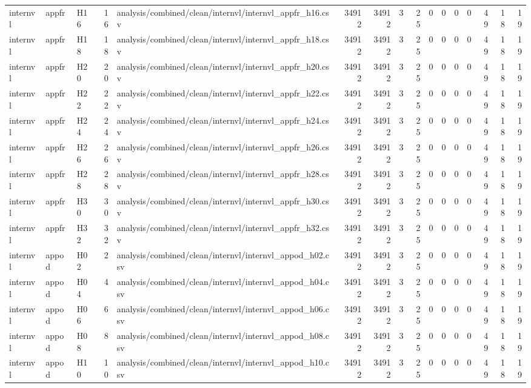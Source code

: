 \begin{longtable}{lllrlrrrrrrrrrrr}
internvl & appfr & H16 & 16 & analysis/combined/clean/internvl/internvl\_appfr\_h16.csv & 34912 & 34912 & 3 & 25 & 0 & 0 & 0 & 0 & 49 & 18 & 19 \\
internvl & appfr & H18 & 18 & analysis/combined/clean/internvl/internvl\_appfr\_h18.csv & 34912 & 34912 & 3 & 25 & 0 & 0 & 0 & 0 & 49 & 18 & 19 \\
internvl & appfr & H20 & 20 & analysis/combined/clean/internvl/internvl\_appfr\_h20.csv & 34912 & 34912 & 3 & 25 & 0 & 0 & 0 & 0 & 49 & 18 & 19 \\
internvl & appfr & H22 & 22 & analysis/combined/clean/internvl/internvl\_appfr\_h22.csv & 34912 & 34912 & 3 & 25 & 0 & 0 & 0 & 0 & 49 & 18 & 19 \\
internvl & appfr & H24 & 24 & analysis/combined/clean/internvl/internvl\_appfr\_h24.csv & 34912 & 34912 & 3 & 25 & 0 & 0 & 0 & 0 & 49 & 18 & 19 \\
internvl & appfr & H26 & 26 & analysis/combined/clean/internvl/internvl\_appfr\_h26.csv & 34912 & 34912 & 3 & 25 & 0 & 0 & 0 & 0 & 49 & 18 & 19 \\
internvl & appfr & H28 & 28 & analysis/combined/clean/internvl/internvl\_appfr\_h28.csv & 34912 & 34912 & 3 & 25 & 0 & 0 & 0 & 0 & 49 & 18 & 19 \\
internvl & appfr & H30 & 30 & analysis/combined/clean/internvl/internvl\_appfr\_h30.csv & 34912 & 34912 & 3 & 25 & 0 & 0 & 0 & 0 & 49 & 18 & 19 \\
internvl & appfr & H32 & 32 & analysis/combined/clean/internvl/internvl\_appfr\_h32.csv & 34912 & 34912 & 3 & 25 & 0 & 0 & 0 & 0 & 49 & 18 & 19 \\
internvl & appod & H02 & 2 & analysis/combined/clean/internvl/internvl\_appod\_h02.csv & 34912 & 34912 & 3 & 25 & 0 & 0 & 0 & 0 & 49 & 18 & 19 \\
internvl & appod & H04 & 4 & analysis/combined/clean/internvl/internvl\_appod\_h04.csv & 34912 & 34912 & 3 & 25 & 0 & 0 & 0 & 0 & 49 & 18 & 19 \\
internvl & appod & H06 & 6 & analysis/combined/clean/internvl/internvl\_appod\_h06.csv & 34912 & 34912 & 3 & 25 & 0 & 0 & 0 & 0 & 49 & 18 & 19 \\
internvl & appod & H08 & 8 & analysis/combined/clean/internvl/internvl\_appod\_h08.csv & 34912 & 34912 & 3 & 25 & 0 & 0 & 0 & 0 & 49 & 18 & 19 \\
internvl & appod & H10 & 10 & analysis/combined/clean/internvl/internvl\_appod\_h10.csv & 34912 & 34912 & 3 & 25 & 0 & 0 & 0 & 0 & 49 & 18 & 19 \\

\end{longtable}
